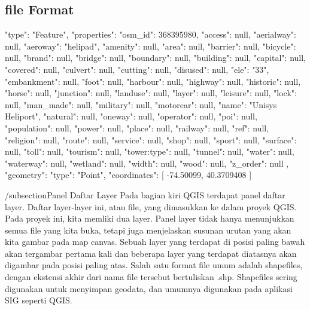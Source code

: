 \subsection{file Format}
{
"type": "Feature",
"properties": {
    "osm_id": 368395980,
    "access": null,
    "aerialway": null,
    "aeroway": "helipad",
    "amenity": null,
    "area": null,
    "barrier": null,
    "bicycle": null,
    "brand": null,
    "bridge": null,
    "boundary": null,
    "building": null,
    "capital": null,
    "covered": null,
    "culvert": null,
    "cutting": null,
    "disused": null,
    "ele": "33",
    "embankment": null,
    "foot": null,
    "harbour": null,
    "highway": null,
    "historic": null,
    "horse": null,
    "junction": null,
    "landuse": null,
    "layer": null,
    "leisure": null,
    "lock": null,
    "man_made": null,
    "military": null,
    "motorcar": null,
    "name": "Unisys Heliport",
    "natural": null,
    "oneway": null,
    "operator": null,
    "poi": null,
    "population": null,
    "power": null,
    "place": null,
    "railway": null,
    "ref": null,
    "religion": null,
    "route": null,
    "service": null,
    "shop": null,
    "sport": null,
    "surface": null,
    "toll": null,
    "tourism": null,
    "tower:type": null,
    "tunnel": null,
    "water": null,
    "waterway": null,
    "wetland": null,
    "width": null,
    "wood": null,
    "z_order": null
},
"geometry": {
    "type": "Point",
    "coordinates": [
        -74.50099,
        40.3709408
    ]
}
}

/subsection{Panel Daftar Layer}
    Pada bagian kiri QGIS terdapat panel daftar layer. Daftar layer-layer ini, atau file, yang dimasukkan ke dalam proyek QGIS. Pada proyek ini, kita memliki dua layer.
    Panel layer tidak hanya menunjukkan semua file yang kita buka, tetapi juga menjelaskan susunan urutan yang akan kita gambar pada map canvas. Sebuah layer yang terdapat di posisi paling bawah akan tergambar pertama kali dan beberapa layer yang terdapat diatasnya akan digambar pada posisi paling atas.
    Salah satu format file umum adalah shapefiles, dengan ekstensi akhir dari nama file tersebut bertuliskan .shp. Shapefiles sering digunakan untuk menyimpan geodata, dan umumnya digunakan pada aplikasi SIG seperti QGIS.

